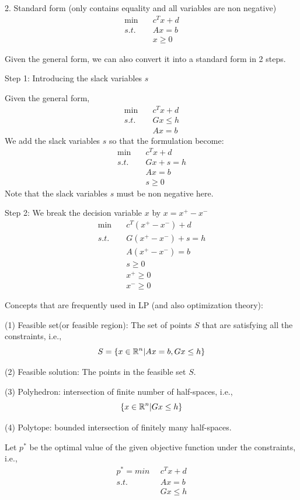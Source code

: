 2. Standard form (only contains equality and all variables are non negative)
\begin{align*}
	\min \quad&c^Tx+d\\
	s.t. \quad&Ax = b\\
	&x\geq 0
\end{align*}

Given the general form, we can also convert it into a standard form in 2 steps.

Step 1: Introducing the slack variables $s$

Given the general form,
\begin{align*}
	\min \quad&c^Tx+d\\
	s.t. \quad&Gx\leq h\\
	&Ax = b
\end{align*}
We add the slack variables $s$ so that the formulation become:
\begin{align*}
	\min \quad&c^Tx+d\\
	s.t. \quad&Gx + s = h\\
	&Ax = b\\
	&s\geq 0
\end{align*}
Note that the slack variables $s$ must be non negative here.


Step 2: We break the decision variable $x$ by $x= x^+ - x^-$
\begin{align*}
	\min \quad &c^T(x^{+} - x^{-})+d\\
	s.t. \quad&G(x^{+} - x^{-}) + s = h\\
	&A(x^{+} - x^{-}) = b\\
	&s\geq 0\\
	&x^{+}\geq 0\\
	&x^{-}\geq 0
\end{align*}


Concepts that are frequently used in LP (and also optimization theory):

(1) Feasible set(or feasible region): The set of points $S$ that are satisfying all the constraints, i.e.,
$$S = \{x\in\mathbb{R}^{n}|Ax = b, Gx \leq h \}$$

(2) Feasible solution: The points in the feasible set $S$.

(3) Polyhedron: intersection of finite number of half-spaces, i.e.,
$$\{x\in\mathbb{R}^{n}|Gx\leq h\}$$

(4) Polytope: bounded intersection of finitely many half-spaces.





\vspace{0.5cm}
Let $p^*$ be the optimal value of the given objective function under the constraints, i.e.,
\begin{align*}
	p^* = min \,\,\, &c^Tx + d\\
	s.t.\,\,\, &Ax = b\\
	&Gx\leq h
\end{align*}

